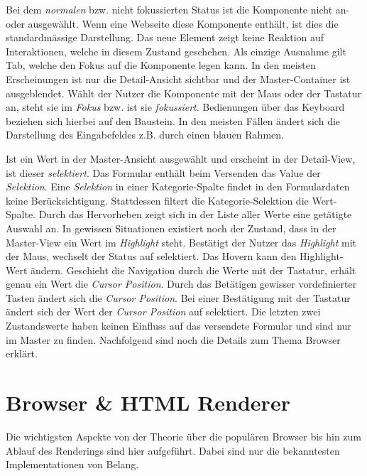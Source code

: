 Bei dem \emph{normalen} bzw. nicht fokussierten Status ist die Komponente nicht an- oder ausgewählt. 
Wenn eine Webseite diese Komponente enthält, ist dies die standardmässige Darstellung. 
Das neue Element zeigt keine Reaktion auf Interaktionen, welche in diesem Zustand geschehen. 
Als einzige Ausnahme gilt Tab, welche den Fokus auf die Komponente legen kann. 
In den meisten Erscheinungen ist nur die Detail-Ansicht sichtbar und der Master-Container ist ausgeblendet. 
Wählt der Nutzer die Komponente mit der Maus oder der Tastatur an, steht sie im \emph{Fokus} bzw. ist sie \emph{fokussiert}. 
Bedienungen über das Keyboard beziehen sich hierbei auf den Baustein. 
In den meisten Fällen ändert sich die Darstellung des Eingabefeldes z.B. durch einen blauen Rahmen. 

Ist ein Wert in der Master-Ansicht ausgewählt und erscheint in der Detail-View, ist dieser \emph{selektiert}. 
Das Formular enthält beim Versenden das Value der \emph{Selektion}. 
Eine \emph{Selektion} in einer Kategorie-Spalte findet in den Formulardaten keine Berücksichtigung. 
Stattdessen filtert die Kategorie-Selektion die Wert-Spalte. 
Durch das Hervorheben zeigt sich in der Liste aller Werte eine getätigte Auswahl an. 
In gewissen Situationen existiert noch der Zustand, dass in der Master-View ein Wert im \emph{Highlight} steht. 
Bestätigt der Nutzer das \emph{Highlight} mit der Maus, wechselt der Status auf selektiert. 
Das Hovern kann den Highlight-Wert ändern. 
Geschieht die Navigation durch die Werte mit der Tastatur, erhält genau ein Wert die \emph{Cursor Position}. 
Durch das Betätigen gewisser vordefinierter Tasten ändert sich die \emph{Cursor Position}. 
Bei einer Bestätigung mit der Tastatur ändert sich der Wert der \emph{Cursor Position} auf selektiert. 
Die letzten zwei Zustandswerte haben keinen Einfluss auf das versendete Formular und sind nur im Master zu finden. 
Nachfolgend sind noch die Details zum Thema Browser erklärt. 


\section{Browser \& HTML Renderer}
\label{sec:browserRenderer}

Die wichtigsten Aspekte von der Theorie über die populären Browser bis hin zum Ablauf des Renderings sind hier aufgeführt. 
Dabei sind nur die bekanntesten Implementationen von Belang. 

